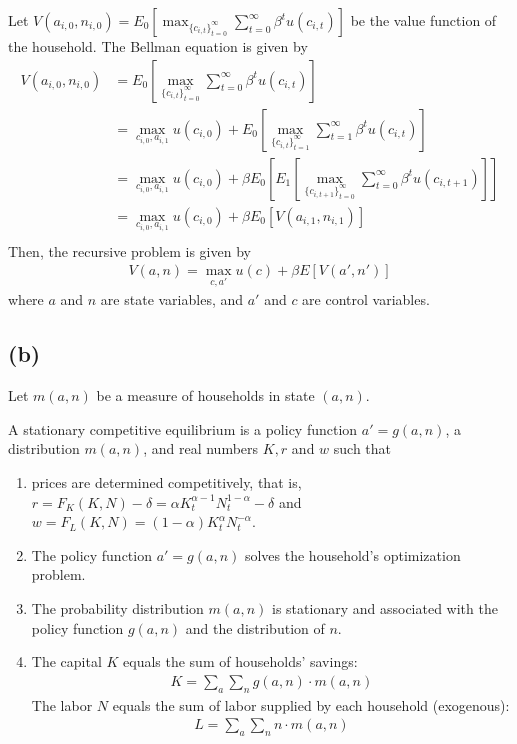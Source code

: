 \documentclass{ltjsarticle}
\begin{document}
Let $V(a_{i,0}, n_{i,0}) = E_0 \left[\max_{\{c_{i,t}\}_{t=0}^{\infty}} \sum_{t=0}^{\infty} \beta^t u(c_{i,t})\right]$ be the value function of the household. The Bellman equation is given by
\begin{align*}
    V(a_{i,0}, n_{i,0}) 
    &= E_0 \left[\max_{\{c_{i,t}\}_{t=0}^{\infty}} \sum_{t=0}^{\infty} \beta^t u(c_{i,t}) \right] \\
    &= \max_{c_{i,0}, a_{i,1}} u(c_{i,0}) + E_0 \left[ \max_{\{c_{i,t}\}_{t=1}^{\infty}} \sum_{t=1}^{\infty} \beta^t u(c_{i,t}) \right] \\
    &= \max_{c_{i,0}, a_{i,1}} u(c_{i,0}) + \beta E_0 \left[E_1 \left[\max_{\{c_{i,t+1}\}_{t=0}^{\infty}} \sum_{t=0}^{\infty} \beta^t u(c_{i,t+1}) \right] \right] \\
    &= \max_{c_{i,0}, a_{i,1}} u(c_{i,0}) + \beta E_0 [V(a_{i,1}, n_{i,1}) ]\\
\end{align*}
Then, the recursive problem is given by
\begin{gather*}
  V(a,n) = \max_{c, a'} u(c) + \beta E[V(a', n')] 
\end{gather*}
where $a$ and $n$ are state variables, and $a'$ and $c$ are control variables.

\subsection*{(b)}
Let $m(a,n)$ be a measure of households in state $(a,n)$.

A stationary competitive equilibrium is a policy function $a' = g(a,n)$, a distribution $m(a,n)$, and real numbers $K, r$ and $w$ such that

\begin{enumerate}
  \item prices are determined competitively, that is, $r = F_K (K,N) - \delta = \alpha K_t^{\alpha-1} N_t^{1-\alpha} - \delta$ and $w = F_L (K, N) = (1-\alpha) K_t^\alpha N_t^{-\alpha}$.
  \item The policy function $a' = g(a,n)$ solves the household's optimization problem.
  \item The probability distribution $m(a,n)$ is stationary and associated with the policy function $g(a,n)$ and the distribution of $n$.
  \item The capital $K$ equals the sum of households' savings:
    \begin{gather*}
      K = \sum_a \sum_n g(a,n) \cdot m(a,n)
    \end{gather*}
    The labor $N$ equals the sum of labor supplied by each household (exogenous):
    \begin{gather*}
      L = \sum_a \sum_n n \cdot m(a,n)
    \end{gather*}   
\end{enumerate}
\end{document}
